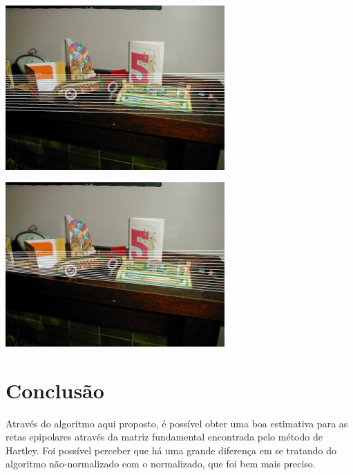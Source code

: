 \documentclass[conference]{IEEEtran}
\begin{document}
		\vspace{2\baselineskip}\vspace{-\parskip}
		\begin{minipage}{\linewidth}
  		\centering
  		\includegraphics[width=3.3in]{img2epiF2}
		\end{minipage}

		
		\vspace{2\baselineskip}\vspace{-\parskip}
		\begin{minipage}{\linewidth}
  		\centering
  		\includegraphics[width=3.3in]{img2epi}
		\end{minipage}	

	
\section{Conclus\~ao} 
\label{sec:meth} 

Atrav\'es do algoritmo aqui proposto, \'e poss\'ivel obter uma boa estimativa para as retas epipolares atrav\'es da 
matriz fundamental encontrada pelo m\'etodo de Hartley. Foi poss\'ivel perceber que h\'a uma grande diferen\c{c}a 
em se tratando do algoritmo n\~ao-normalizado com o normalizado, que foi bem mais preciso. 
\end{document}
